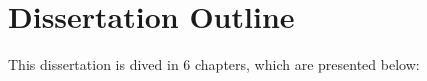 


\section{Dissertation Outline}
\label{sec:dissertaion_outline}
This dissertation is dived in 6 chapters, which are presented below:


